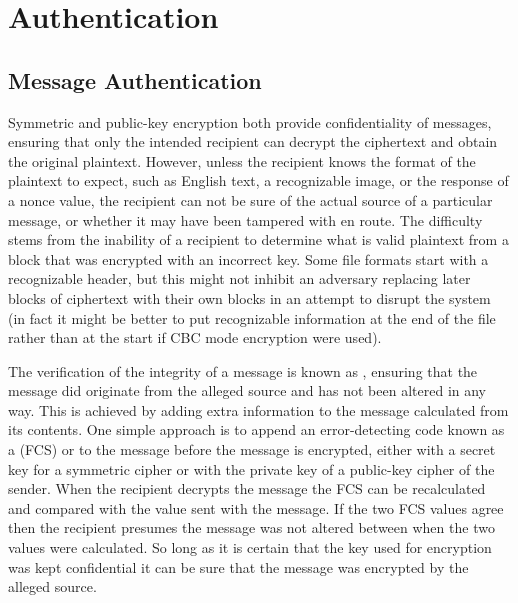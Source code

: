 
\chapter{Authentication}


\section{Message Authentication}\label{Se:MessageAuthentication}


Symmetric and public-key encryption both provide confidentiality of messages,
ensuring that only the intended recipient can decrypt the ciphertext and
obtain the original plaintext. However, unless the recipient knows the format of the
plaintext to expect, such as English text, a recognizable image,
or the response of a nonce value,
the recipient can not be sure of the actual source of a particular message,
or whether it may have been tampered with en route.
The difficulty stems from the inability of a recipient to determine what is valid plaintext
from a block that was encrypted with an incorrect key.
Some file formats start with a recognizable header, but this might not
inhibit an adversary replacing later blocks of ciphertext with their own blocks
in an attempt to disrupt the system (in fact it might be better to put recognizable
information at the end of the file rather than at the start if CBC mode encryption were used).

The verification of the integrity of a message is known as
, ensuring that the message did originate
from the alleged source and has not been altered in any way.
This is achieved by adding extra information to the message calculated from its contents.
One simple approach is to append an error-detecting code known as a
 (FCS) or  to the message before the
message is encrypted, either with a secret key for a symmetric cipher or with the private key
of a public-key cipher of the sender. When the recipient decrypts the message the FCS can be
recalculated and compared with the value sent with the message.
If the two FCS values agree then the recipient presumes the message was not
altered between when the two values were calculated.
So long as it is certain that the key used for encryption was kept confidential
it can be sure that the message was encrypted by the alleged source.

